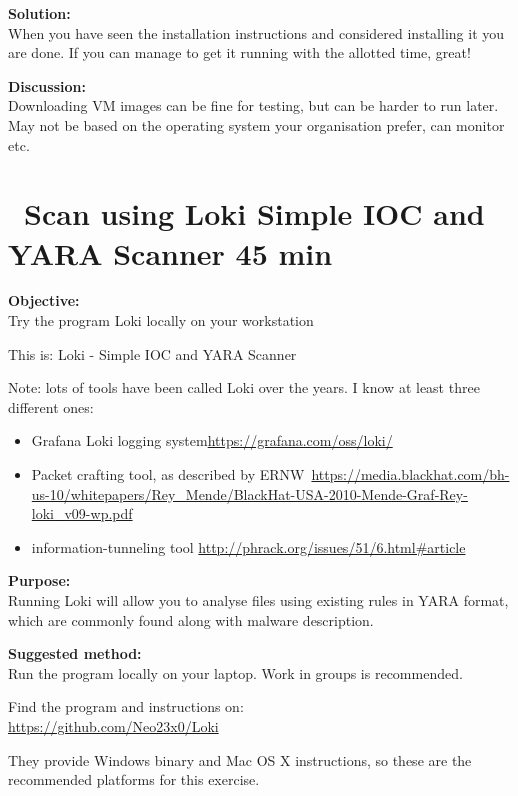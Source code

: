 \documentclass[a4paper,11pt,notitlepage]{report}
\begin{document}
{\bf Solution:}\\
When you have seen the installation instructions and considered installing it you are done. If you can manage to get it running with the allotted time, great!

{\bf Discussion:}\\
Downloading VM images can be fine for testing, but can be harder to run later. May not be based on the operating system your organisation prefer, can monitor etc.




\chapter{\faExclamationTriangle\ Scan using Loki Simple IOC and YARA Scanner 45 min}
\label{ex:loki-ioc-yara}

{\bf Objective:}\\
Try the program Loki locally on your workstation

This is: Loki - Simple IOC and YARA Scanner

Note: lots of tools have been called Loki over the years. I know at least three different ones:
\begin{itemize}
\item Grafana Loki logging system\url{https://grafana.com/oss/loki/}
\item Packet crafting tool, as described by ERNW\
\url{https://media.blackhat.com/bh-us-10/whitepapers/Rey_Mende/BlackHat-USA-2010-Mende-Graf-Rey-loki_v09-wp.pdf}
\item information-tunneling tool \url{http://phrack.org/issues/51/6.html#article}
\end{itemize}


{\bf Purpose:}\\
Running Loki will allow you to analyse files using existing rules in YARA format, which are commonly found along with malware description.


\begin{alltt}


\end{alltt}


{\bf Suggested method:}\\
Run the program locally on your laptop. Work in groups is recommended.

Find the program and instructions on:\\
\url{https://github.com/Neo23x0/Loki}

They provide Windows binary and Mac OS X instructions, so these are the recommended platforms for this exercise.
\end{document}
